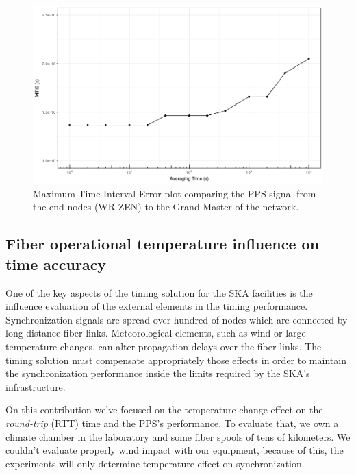 \begin{figure}
	\centering
	\includegraphics[width=0.9\linewidth]{img/MTIE_exp3}
	\caption[MTIE of the end-nodes in the scalability test.]{Maximum Time 
	Interval Error
	plot comparing the PPS signal from the end-nodes (WR-ZEN) to the Grand 
	Master of the network.}
	\label{fig:mtienet}
\end{figure}

\subsection{Fiber operational temperature influence on time accuracy}

One of the key aspects of the timing solution for the SKA facilities is the 
influence evaluation of the external elements in the timing performance. 
Synchronization signals are spread over hundred of nodes which are connected by 
long distance fiber links. Meteorological elements, such as wind or large 
 temperature changes, can alter propagation delays over the fiber 
links. The timing solution must compensate appropriately those effects in order 
to maintain the synchronization performance inside the limits required by the 
SKA's infrastructure.

On this contribution we've focused on the temperature change effect on the 
\textit{round-trip} (RTT) time and the PPS's performance. To evaluate that, we 
own a 
climate chamber in the laboratory and some fiber spools of tens of kilometers. 
We couldn't evaluate properly wind impact with our equipment, because of this, 
the experiments will only determine temperature effect on synchronization.


